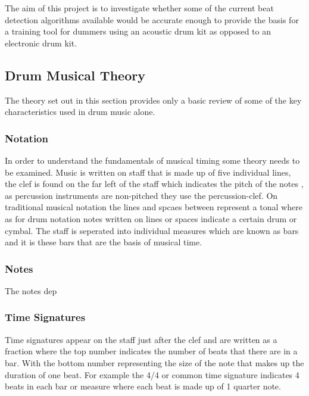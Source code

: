 \documentclass[a4paper, 11pt]{article}
\begin{document}
The aim of this project is to investigate whether some of the current beat detection algorithms available would be accurate enough to provide the basis for a training tool for dummers using an acoustic drum kit as opposed to an electronic drum kit.

\maketitle{} \subsection{Drum Musical Theory}
The theory set out in this section provides only a basic review of some of the key characteristics used in drum music alone. 
\maketitle{} \subsubsection{Notation}
In order to understand the fundamentals of musical timing some theory needs to be examined. Music is written on staff that is made up of five individual lines, the clef is found on the far left of the staff which indicates the pitch of the notes \cite{oxford-comp}, as percussion instruments are non-pitched they use the percussion-clef. On traditional musical notation the lines and spcaes between represent a tonal where as for drum notation notes written on lines or spaces indicate a certain drum or cymbal. The staff is seperated into individual measures which are known as bars \cite{drum-note} and it is these bars that are the basis of musical time.
\maketitle{} \subsubsection{Notes}
The notes dep
\maketitle{} \subsubsection{Time Signatures}
Time signatures appear on the staff just after the clef and are written as a fraction where the top number indicates the number of beats that there are in a bar. With the bottom number representing the size of the note that makes up the duration of one beat. For example the 4/4 or common time signature indicates 4 beats in each bar or measure where each beat is made up of 1 quarter note.
\end{document}
